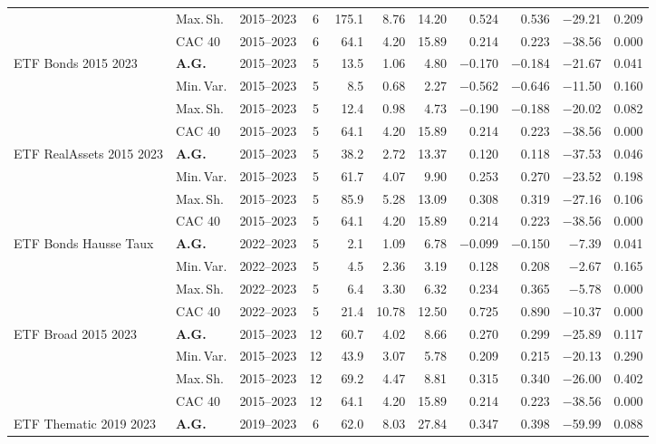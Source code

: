 \begin{longtable}{p{2.6cm} l c c r r r r r r r}
 & Max.\,Sh. & 2015--2023 & 6 & 175.1 & 8.76 & 14.20 & 0.524 & 0.536 & $-$29.21 & 0.209 \\
 & CAC 40 & 2015--2023 & 6 & 64.1 & 4.20 & 15.89 & 0.214 & 0.223 & $-$38.56 & 0.000 \\
\midrule
ETF Bonds 2015 2023 & \textbf{A.G.} & 2015--2023 & 5 & 13.5 & 1.06 & 4.80 & $-$0.170 & $-$0.184 & $-$21.67 & 0.041 \\
 & Min.\,Var. & 2015--2023 & 5 & 8.5 & 0.68 & 2.27 & $-$0.562 & $-$0.646 & $-$11.50 & 0.160 \\
 & Max.\,Sh. & 2015--2023 & 5 & 12.4 & 0.98 & 4.73 & $-$0.190 & $-$0.188 & $-$20.02 & 0.082 \\
 & CAC 40 & 2015--2023 & 5 & 64.1 & 4.20 & 15.89 & 0.214 & 0.223 & $-$38.56 & 0.000 \\
\midrule
ETF RealAssets 2015 2023 & \textbf{A.G.} & 2015--2023 & 5 & 38.2 & 2.72 & 13.37 & 0.120 & 0.118 & $-$37.53 & 0.046 \\
 & Min.\,Var. & 2015--2023 & 5 & 61.7 & 4.07 & 9.90 & 0.253 & 0.270 & $-$23.52 & 0.198 \\
 & Max.\,Sh. & 2015--2023 & 5 & 85.9 & 5.28 & 13.09 & 0.308 & 0.319 & $-$27.16 & 0.106 \\
 & CAC 40 & 2015--2023 & 5 & 64.1 & 4.20 & 15.89 & 0.214 & 0.223 & $-$38.56 & 0.000 \\
\midrule
ETF Bonds Hausse Taux & \textbf{A.G.} & 2022--2023 & 5 & 2.1 & 1.09 & 6.78 & $-$0.099 & $-$0.150 & $-$7.39 & 0.041 \\
 & Min.\,Var. & 2022--2023 & 5 & 4.5 & 2.36 & 3.19 & 0.128 & 0.208 & $-$2.67 & 0.165 \\
 & Max.\,Sh. & 2022--2023 & 5 & 6.4 & 3.30 & 6.32 & 0.234 & 0.365 & $-$5.78 & 0.000 \\
 & CAC 40 & 2022--2023 & 5 & 21.4 & 10.78 & 12.50 & 0.725 & 0.890 & $-$10.37 & 0.000 \\
\midrule
ETF Broad 2015 2023 & \textbf{A.G.} & 2015--2023 & 12 & 60.7 & 4.02 & 8.66 & 0.270 & 0.299 & $-$25.89 & 0.117 \\
 & Min.\,Var. & 2015--2023 & 12 & 43.9 & 3.07 & 5.78 & 0.209 & 0.215 & $-$20.13 & 0.290 \\
 & Max.\,Sh. & 2015--2023 & 12 & 69.2 & 4.47 & 8.81 & 0.315 & 0.340 & $-$26.00 & 0.402 \\
 & CAC 40 & 2015--2023 & 12 & 64.1 & 4.20 & 15.89 & 0.214 & 0.223 & $-$38.56 & 0.000 \\
\midrule
ETF Thematic 2019 2023 & \textbf{A.G.} & 2019--2023 & 6 & 62.0 & 8.03 & 27.84 & 0.347 & 0.398 & $-$59.99 & 0.088 \\

\end{longtable}
